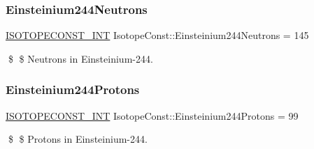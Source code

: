 \subsubsection{\texorpdfstring{Einsteinium244\+Neutrons}{Einsteinium244Neutrons}}
{\footnotesize\ttfamily \mbox{\hyperlink{group___isotope_const-_macros_ga5f18360b3e99483a35c32d789e62621c}{I\+S\+O\+T\+O\+P\+E\+C\+O\+N\+S\+T\+\_\+\+I\+NT}} Isotope\+Const\+::\+Einsteinium244\+Neutrons = 145}

\$ \$ Neutrons in Einsteinium-\/244. \mbox{\label{group___isotope_const-_einsteinium-_es244_gaa6ca03f17c7b6262c5d647e34dc5a802}} 
\subsubsection{\texorpdfstring{Einsteinium244\+Protons}{Einsteinium244Protons}}
{\footnotesize\ttfamily \mbox{\hyperlink{group___isotope_const-_macros_ga5f18360b3e99483a35c32d789e62621c}{I\+S\+O\+T\+O\+P\+E\+C\+O\+N\+S\+T\+\_\+\+I\+NT}} Isotope\+Const\+::\+Einsteinium244\+Protons = 99}

\$ \$ Protons in Einsteinium-\/244. 